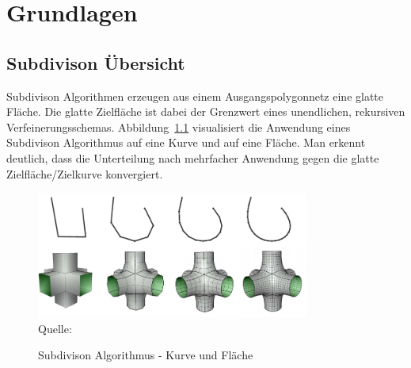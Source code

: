 \chapter{Grundlagen}


\section{Subdivison Übersicht}

Subdivison Algorithmen erzeugen aus einem Ausgangspolygonnetz eine glatte Fläche.
Die glatte Zielfläche ist dabei der Grenzwert eines unendlichen, rekursiven Verfeinerungsschemas.
Abbildung~\ref{fig:sd} visualisiert die Anwendung eines Subdivison Algorithmus auf eine Kurve und auf eine Fläche.
Man erkennt deutlich, dass die Unterteilung nach mehrfacher Anwendung gegen die glatte Zielfläche/Zielkurve konvergiert.
\begin{figure}[h]
  \caption{Subdivison Algorithmus - Kurve und Fläche}
  \centering
  \includegraphics[width=0.8\textwidth]{content/media/sd.png}
  \\Quelle: \cite{Standford.24.07.2015}
  \label{fig:sd}
\end{figure}

